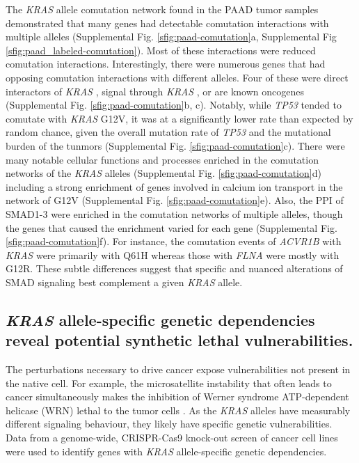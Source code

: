 \documentclass[english, 12pt, letterpaper]{article}
\newcommand{\KRAS}{\emph{KRAS}}
\begin{document}
The \KRAS{} allele comutation network found in the PAAD tumor samples demonstrated that many genes had detectable comutation interactions with multiple alleles (Supplemental Fig. \ref{sfig:paad-comutation}a, Supplemental Fig \ref{sfig:paad_labeled-comutation}).
Most of these interactions were reduced comutation interactions.
Interestingly, there were numerous genes that had opposing comutation interactions with different alleles.
Four of these were direct interactors of \KRAS{} \cite{Kovalski2019}, signal through \KRAS{} \cite{Kanehisa2017, Kanehisa2016KEGGAnnotation.}, or are known oncogenes \cite{Bamford2004TheWebsite., Sondka2018} (Supplemental Fig. \ref{sfig:paad-comutation}b, c).
Notably, while \emph{TP53} tended to comutate with \KRAS{} G12V, it was at a significantly lower rate than expected by random chance, given the overall mutation rate of \emph{TP53} and the mutational burden of the tunmors (Supplemental Fig. \ref{sfig:paad-comutation}c).
There were many notable cellular functions and processes enriched in the comutation networks of the \KRAS{} alleles (Supplemental Fig. \ref{sfig:paad-comutation}d) including a strong enrichment of genes involved in calcium ion transport in the network of G12V (Supplemental Fig. \ref{sfig:paad-comutation}e).
Also, the PPI of SMAD1-3 were enriched in the comutation networks of multiple alleles, though the genes that caused the enrichment varied for each gene (Supplemental Fig. \ref{sfig:paad-comutation}f).
For instance, the comutation events of \emph{ACVR1B} with \KRAS{} were primarily with Q61H whereas those with \emph{FLNA} were mostly with G12R.
These subtle differences suggest that specific and nuanced alterations of SMAD signaling best complement a given \KRAS{} allele.


\subsection*{\KRAS{} allele-specific genetic dependencies reveal potential synthetic lethal vulnerabilities.}

The perturbations necessary to drive cancer expose vulnerabilities not present in the native cell.
For example, the microsatellite instability that often leads to cancer simultaneously makes the inhibition of Werner syndrome ATP-dependent helicase (WRN) lethal to the tumor cells \cite{Behan2019, Chan2019}.
As the \KRAS{} alleles have measurably different signaling behaviour, they likely have specific genetic vulnerabilities.
Data from a genome-wide, CRISPR-Cas9 knock-out screen of cancer cell lines \cite{Tsherniak2017, Meyers2017} were used to identify genes with \KRAS{} allele-specific genetic dependencies.
\end{document}
